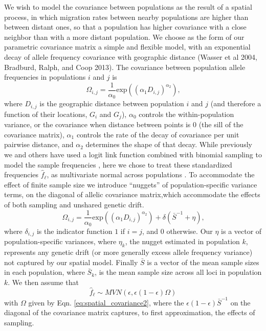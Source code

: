 \documentclass[12pt]{article}
\begin{document}
We wish to model the covariance between populations as the result of a spatial process, in which migration rates between nearby populations are higher than between distant ones, so that a population has higher covariance with a close neighbor than with a more distant population.  We choose as the form of our parametric covariance matrix a simple and flexible model, with an exponential decay of allele frequency covariance with geographic distance (Wasser et al 2004, Bradburd, Ralph, and Coop 2013).  The covariance between population allele frequencies in populations $i$ and $j$ is 
%
\begin{equation}
\Omega_{i,j} = \frac{1}{\alpha_0} \text{exp} \left(	\left( \alpha_1D_{i,j} \right)^{\alpha_2} \right) \text{,}
\end{equation}
%
where $D_{i,j}$ is the geographic distance between population $i$ and $j$ (and therefore a function of their locations, $G_i$ and $G_j$), $\alpha_0$ controls the within-population variance, or the covariance when distance between points is 0 (the sill of the covariance matrix),  $\alpha_1$ controls the rate of the decay of covariance per unit pairwise distance, and $\alpha_2$ determines the shape of that decay. While previously we and others have used a logit link function combined with binomial sampling to model the sample frequencies \citep{Wasser, Bradburd}, here we chose to treat these standardized frequencies $\hat{f}_{\ell}$, as multivariate normal across populations \citep[]{Treemix}. To accommodate the effect of finite sample size we introduce ``nuggets'' of population-specific variance terms, on the diagonal of allelic covariance matrix,which accommodate the effects of both sampling and unshared genetic drift.
%
\begin{equation}
\Omega_{i,j} = \frac{1}{\alpha_0} \text{exp} \left(	\left( \alpha_1D_{i,j} \right)^{\alpha_2} \right) + \delta(\bar{S}^{-1} + \eta) \text{,}
\end{equation}
%
where $\delta_{i,j}$ is the indicator function $1$ if $i=j$, and $0$ otherwise. Our $\eta$ is a vector of population-specific variances, where $\eta_k$, the nugget estimated in population $k$, represents any genetic drift (or more generally excess allele frequency variance) not captured by our spatial model. Finally $\bar{S}$ is a vector of the mean sample sizes in each population, where $\bar{S}_k$, is the mean sample size across all loci in population $k$.  We then assume that
%
\begin{equation}
\hat{f}_{\ell} \sim MVN(\epsilon, \epsilon (1-\epsilon)\Omega)
\end{equation}
%
with $\Omega$ given by Eqn. \eqref{eq:spatial_covariance2},  where the $\epsilon(1 - \epsilon)  \bar{S}^{-1}$ on the diagonal of the covariance matrix captures, to first approximation, the effects of sampling.
\end{document}
